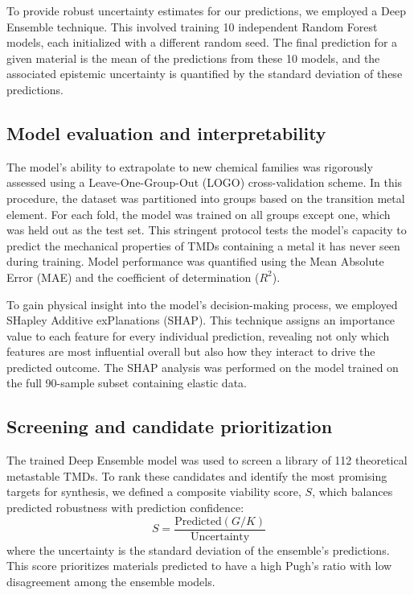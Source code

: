 \documentclass[]{article}
\begin{document}
To provide robust uncertainty estimates for our predictions, we employed a Deep Ensemble technique. This involved training 10 independent Random Forest models, each initialized with a different random seed. The final prediction for a given material is the mean of the predictions from these 10 models, and the associated epistemic uncertainty is quantified by the standard deviation of these predictions.

\subsection{Model evaluation and interpretability}
The model's ability to extrapolate to new chemical families was rigorously assessed using a Leave-One-Group-Out (LOGO) cross-validation scheme. In this procedure, the dataset was partitioned into groups based on the transition metal element. For each fold, the model was trained on all groups except one, which was held out as the test set. This stringent protocol tests the model's capacity to predict the mechanical properties of TMDs containing a metal it has never seen during training. Model performance was quantified using the Mean Absolute Error (MAE) and the coefficient of determination ($R^2$).

To gain physical insight into the model's decision-making process, we employed SHapley Additive exPlanations (SHAP). This technique assigns an importance value to each feature for every individual prediction, revealing not only which features are most influential overall but also how they interact to drive the predicted outcome. The SHAP analysis was performed on the model trained on the full 90-sample subset containing elastic data.

\subsection{Screening and candidate prioritization}
The trained Deep Ensemble model was used to screen a library of 112 theoretical metastable TMDs. To rank these candidates and identify the most promising targets for synthesis, we defined a composite viability score, $S$, which balances predicted robustness with prediction confidence:
\begin{equation}
S = \frac{\text{Predicted}(G/K)}{\text{Uncertainty}}
\end{equation}
where the uncertainty is the standard deviation of the ensemble's predictions. This score prioritizes materials predicted to have a high Pugh's ratio with low disagreement among the ensemble models.
\end{document}
